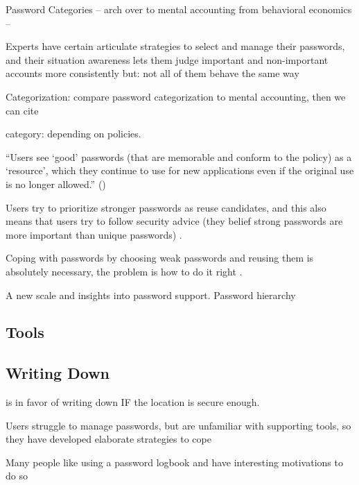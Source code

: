 	Password Categories -- arch over to mental accounting from behavioral economics -- \cite{Thaler2004}
	
	Experts have certain articulate strategies to select and manage their passwords, and their situation awareness lets them judge important and non-important accounts more consistently  	\cite{Stobert2015ExpertPassword} 
	but: not all of them behave the same way \cite{Loutfi2015PasswordsOtherSideOfTheFence}

	Categorization: 
	compare password categorization to mental accounting, then we can cite \cite{Stockinger2015TowardsBE}
	
	category: depending on policies. \cite{Stobert2014PasswordLifeCycle}
	
	
	``Users see `good' passwords (that are memorable and conform to the policy) as a `resource', which they continue to use for new applications even if the original use is no longer allowed.'' (\cite{Inglesant2010TrueCostOfUnusablePolicies})
	
	Users try to prioritize stronger passwords as reuse candidates, and this also means that users try to follow security advice (they belief strong passwords are more important than unique passwords) \cite{Wash2016UnderstandingPasswordChoices}.
	
	Coping with passwords by choosing weak passwords and reusing them is absolutely necessary, the problem is how to do it right \cite{Florencio2014PasswordPortfoliosFiniteUser}.
	
	A new scale and insights into password support. Password hierarchy \cite{Haque2015PhdProposal}
	
	\subsection{Tools}
	
	\subsection{Writing Down}
	\cite{Herley2012PersistenceOfPasswords} is in favor of writing down IF the location is secure enough.
	
	Users struggle to manage passwords, but are unfamiliar with supporting tools, so they have developed elaborate strategies to cope \cite{Stobert2014Agony}
	
	Many people like using a password logbook and have interesting motivations to do so \cite{Kothari2017PasswordLogbooks}
	
